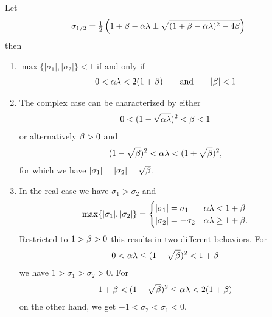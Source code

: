 \begin{theorem}
	\label{thm-appdx: momentum - stable set of parameters}
	Let
	\begin{align*}
		\sigma_{1/2}
		= \tfrac12 \left(
			1+\beta-\alpha\lambda \pm \sqrt{(1+\beta-\alpha\lambda)^2 - 4\beta}
		\right)
	\end{align*}
	then 
	\begin{enumerate}
		\item \(\max\{|\sigma_1|,|\sigma_2|\}<1\) if and only if
		\begin{align*}
			0<\alpha\lambda < 2(1+\beta) \qquad \text{and} \qquad |\beta|<1
		\end{align*}
		\item The complex case can be characterized by either
		\begin{align*}
			0<(1-\sqrt{\alpha\lambda})^2 < \beta < 1
		\end{align*}		
		or alternatively \(\beta>0\) and
		\begin{align*}
			(1-\sqrt{\beta})^2 < \alpha\lambda < (1+\sqrt{\beta})^2,
		\end{align*}
		for which we have \(|\sigma_1|=|\sigma_2|=\sqrt{\beta}\).
		
		\item In the real case we have \(\sigma_1>\sigma_2\) and
		\begin{align}\label{eq: when does sigma_1 or sigma_2 dominate?}
			\max\{|\sigma_1|, |\sigma_2|\} = \begin{cases}
				|\sigma_1|=\sigma_1 & \alpha\lambda < 1+\beta \\
				|\sigma_2|=-\sigma_2 & \alpha\lambda \ge 1+\beta.
			\end{cases}
		\end{align}
		Restricted to \(1>\beta>0\) this results in two different	
		behaviors. For
		\begin{align*}
			0<\alpha\lambda \le (1-\sqrt{\beta})^2 < 1+\beta
		\end{align*}
		we have \(1>\sigma_1 > \sigma_2 > 0\). For
		\begin{align*}
			1+\beta < (1+\sqrt{\beta})^2\le \alpha\lambda < 2(1+\beta)
		\end{align*}
		on the other hand, we get \(-1 < \sigma_2 < \sigma_1 < 0\).
	\end{enumerate}
\end{theorem}
